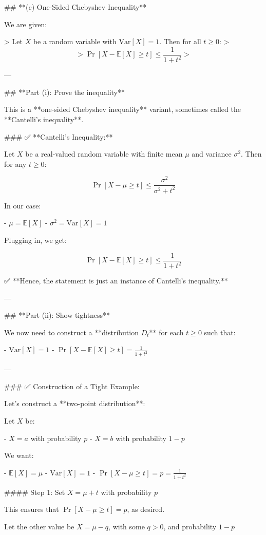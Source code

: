 ## **(c) One-Sided Chebyshev Inequality**

We are given:

> Let \( X \) be a random variable with \( \text{Var}[X] = 1 \). Then for all \( t \ge 0 \):
> \[
> \Pr[X - \mathbb{E}[X] \ge t] \le \frac{1}{1 + t^2}
> \]

---

## **Part (i): Prove the inequality**

This is a **one-sided Chebyshev inequality** variant, sometimes called the **Cantelli's inequality**.

### ✅ **Cantelli's Inequality:**

Let \( X \) be a real-valued random variable with finite mean \( \mu \) and variance \( \sigma^2 \). Then for any \( t \ge 0 \):

\[
\Pr[X - \mu \ge t] \le \frac{\sigma^2}{\sigma^2 + t^2}
\]

In our case:

- \( \mu = \mathbb{E}[X] \)
- \( \sigma^2 = \text{Var}[X] = 1 \)

Plugging in, we get:

\[
\Pr[X - \mathbb{E}[X] \ge t] \le \frac{1}{1 + t^2}
\]

✅ **Hence, the statement is just an instance of Cantelli's inequality.**

---

## **Part (ii): Show tightness**

We now need to construct a **distribution \( D_t \)** for each \( t \ge 0 \) such that:

- \( \text{Var}[X] = 1 \)
- \( \Pr[X - \mathbb{E}[X] \ge t] = \frac{1}{1 + t^2} \)

---

### ✅ Construction of a Tight Example:

Let's construct a **two-point distribution**:

Let \( X \) be:

- \( X = a \) with probability \( p \)
- \( X = b \) with probability \( 1 - p \)

We want:

- \( \mathbb{E}[X] = \mu \)
- \( \text{Var}[X] = 1 \)
- \( \Pr[X - \mu \ge t] = p = \frac{1}{1 + t^2} \)

#### Step 1: Set \( X = \mu + t \) with probability \( p \)

This ensures that \( \Pr[X - \mu \ge t] = p \), as desired.

Let the other value be \( X = \mu - q \), with some \( q > 0 \), and probability \( 1 - p \)

